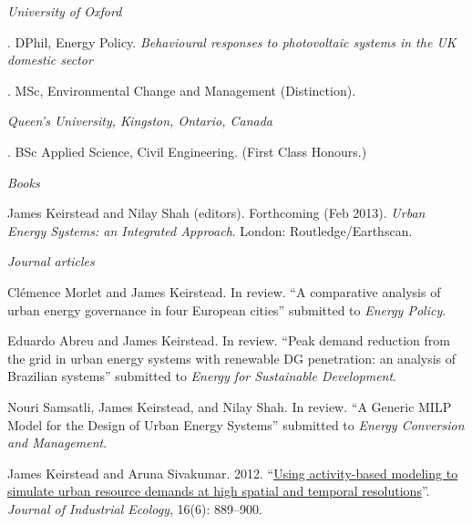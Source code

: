 \documentclass[11pt,a4paper]{article}
\begin{document}
\noindent{}%
%
\emph{University of Oxford \vspace{0.01in}}

.  DPhil, Energy Policy. \emph{Behavioural responses to photovoltaic systems in the UK domestic sector}

.  MSc, Environmental Change and Management (Distinction).

\medskip

\noindent\emph{Queen's University, Kingston, Ontario, Canada\vspace{0.02in}}

. BSc Applied Science, Civil Engineering. (First Class Honours.) 

\bigskip
 
\noindent{}%
%
\noindent\emph{Books \vspace{0.01in}}

\ind James Keirstead and Nilay Shah (editors). Forthcoming (Feb 2013). \emph{Urban Energy Systems: an Integrated Approach}. London: Routledge/Earthscan.

\bigskip

\emph{Journal articles \vspace{0.01in}} %
 

\ind Clémence Morlet and James Keirstead. In review. ``A comparative analysis of urban energy governance in four European cities'' submitted to \emph{Energy Policy}.

\ind Eduardo Abreu and James Keirstead. In review. ``Peak demand reduction from the grid in urban energy systems with renewable DG penetration: an analysis of Brazilian systems'' submitted to \emph{Energy for Sustainable Development}.

\ind Nouri Samsatli, James Keirstead, and Nilay Shah. In review. ``A Generic MILP Model for the Design of Urban Energy Systems'' submitted to \emph{Energy Conversion and Management}.

\ind James Keirstead and Aruna Sivakumar. 2012. ``\href{http://dx.doi.org/10.1111/j.1530-9290.2012.00486.x}{Using activity-based modeling to simulate urban resource demands at high spatial and temporal resolutions}''. \emph{Journal of Industrial Ecology}, 16(6): 889--900.
\end{document}
